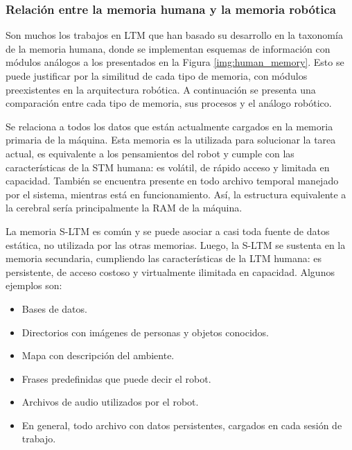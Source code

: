 \subsubsection{Relación entre la memoria humana y la memoria robótica}
Son muchos los trabajos en LTM que han basado su desarrollo en la taxonomía de la memoria humana, donde se implementan esquemas de información con módulos análogos a los presentados en la Figura \ref{img:human_memory}. Esto se puede justificar por la similitud de cada tipo de memoria, con módulos preexistentes en la arquitectura robótica. A continuación se presenta una comparación entre cada tipo de memoria, sus procesos y el análogo robótico.



Se relaciona a todos los datos que están actualmente cargados en la memoria primaria de la máquina. Esta memoria es la utilizada para solucionar la tarea actual, es equivalente a los pensamientos del robot y cumple con las características de la STM humana: es volátil, de rápido acceso y limitada en capacidad. También se encuentra presente en todo archivo temporal manejado por el sistema, mientras está en funcionamiento. Así, la estructura equivalente a la cerebral sería principalmente la RAM de la máquina.



La memoria S-LTM es común y se puede asociar a casi toda fuente de datos estática, no utilizada por las otras memorias. Luego, la S-LTM se sustenta en la memoria secundaria, cumpliendo las características de la LTM humana: es persistente, de acceso costoso y virtualmente ilimitada en capacidad. Algunos ejemplos son:
\begin{itemize}[topsep=0pt]
	\setlength\itemsep{0.2em}
	\item Bases de datos.
	\item Directorios con imágenes de personas y objetos conocidos.
	\item Mapa con descripción del ambiente.
	\item Frases predefinidas que puede decir el robot.
	\item Archivos de audio utilizados por el robot.
	\item En general, todo archivo con datos persistentes, cargados en cada sesión de trabajo.
\end{itemize}


